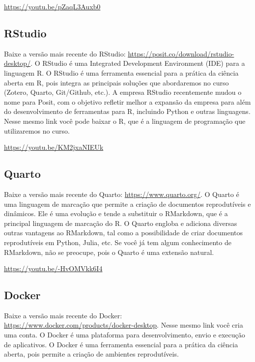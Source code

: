 \documentclass[
  a4paper,
]{article}
\begin{document}
\url{https://youtu.be/pZaqL3Auxb0}

\subsection*{RStudio}\label{sec-rstudioprework}


Baixe a versão mais recente do RStudio:
\url{https://posit.co/download/rstudio-desktop/}. O RStudio é uma
Integrated Development Environment (IDE) para a linguagem R. O RStudio é
uma ferramenta essencial para a prática da ciência aberta em R, pois
integra as principais soluções que abordaremos no curso (Zotero, Quarto,
Git/Github, etc.). A empresa RStudio recentemente mudou o nome para
Posit, com o objetivo refletir melhor a expansão da empresa para além do
desenvolvimento de ferramentas para R, incluindo Python e outras
linguagens. Nesse mesmo link você pode baixar o R, que é a linguagem de
programação que utilizaremos no curso.

\url{https://youtu.be/KM2jxaNIEUk}

\subsection*{Quarto}\label{sec-quartoprework}


Baixe a versão mais recente do Quarto: \url{https://www.quarto.org/}. O
Quarto é uma linguagem de marcação que permite a criação de documentos
reprodutíveis e dinâmicos. Ele é uma evolução e tende a substituir o
RMarkdown, que é a principal linguagem de marcação do R. O Quarto
engloba e adiciona diversas outras vantagens ao RMarkdown, tal como a
possibilidade de criar documentos reprodutíveis em Python, Julia, etc.
Se você já tem algum conhecimento de RMarkdown, não se preocupe, pois o
Quarto é uma extensão natural.

\url{https://youtu.be/-HvOMVkk6I4}

\subsection*{Docker}\label{sec-dockerprework}


Baixe a versão mais recente do Docker:
\url{https://www.docker.com/products/docker-desktop}. Nesse mesmo link
você cria uma conta. O Docker é uma plataforma para desenvolvimento,
envio e execução de aplicativos. O Docker é uma ferramenta essencial
para a prática da ciência aberta, pois permite a criação de ambientes
reprodutíveis.
\end{document}
